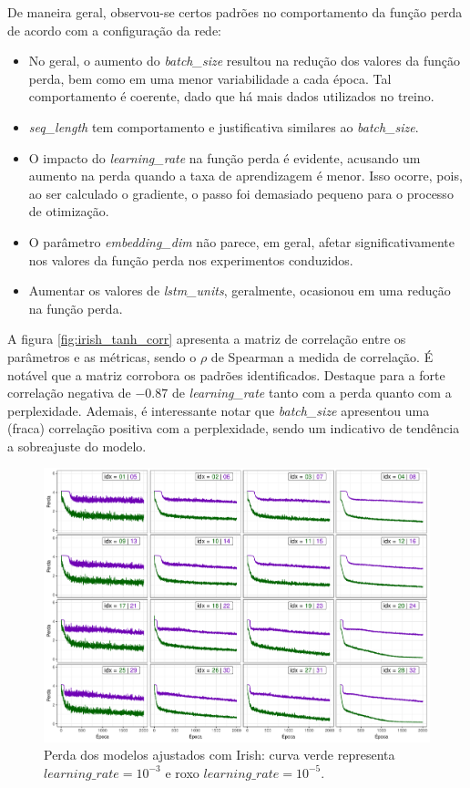 \documentclass{automatextcc}
\begin{document}
De maneira geral, observou-se certos padrões no comportamento da função perda de acordo com a configuração da rede:
\begin{itemize}
    \item No geral, o aumento do \textit{batch\_size} resultou na redução dos valores da função perda, bem como em uma menor variabilidade a cada época. Tal comportamento é coerente, dado que há mais dados utilizados no treino.
    \item \textit{seq\_length} tem comportamento e justificativa similares ao \textit{batch\_size}.
    \item O impacto do \textit{learning\_rate} na função perda é evidente, acusando um aumento na perda quando a taxa de aprendizagem é menor. Isso ocorre, pois, ao ser calculado o gradiente, o passo foi demasiado pequeno para o processo de otimização. 
    \item O parâmetro \textit{embedding\_dim} não parece, em geral, afetar significativamente nos valores da função perda nos experimentos conduzidos.
    \item Aumentar os valores de \textit{lstm\_units}, geralmente, ocasionou em uma redução na função perda. 
\end{itemize}

A figura \ref{fig:irish_tanh_corr} apresenta a matriz de correlação entre os parâmetros e as métricas, sendo o $\rho$ de Spearman a medida de correlação. É notável que a matriz corrobora os padrões identificados. Destaque para a forte correlação negativa de $-0.87$ de \textit{learning\_rate} tanto com a perda quanto com a perplexidade. Ademais, é interessante notar que \textit{batch\_size} apresentou uma (fraca) correlação positiva com a perplexidade, sendo um indicativo de tendência a sobreajuste do modelo. 

\begin{figure}[!ht]
    \centering
    \includegraphics[width=\textwidth]{irish_tanh_loss.pdf}
    \caption{Perda dos modelos ajustados com Irish: curva verde representa $learning\_rate = 10^{-3}$ e roxo $learning\_rate = 10^{-5}$.}
    \label{fig:irish_tanh_loss}
\end{figure}
\end{document}

